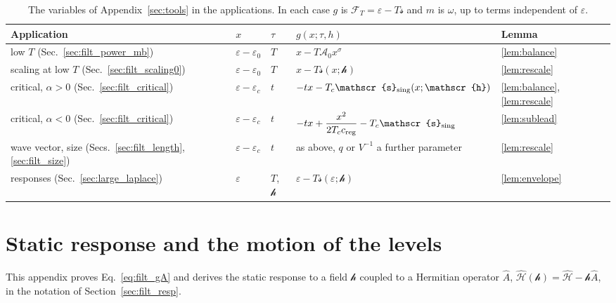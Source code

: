 \documentclass[10pt,a4paper]{article}
\theoremstyle{plain}
\newcommand{\cA}{{\mathcal{A}_0}}   %
\newcommand{\hfield}{\mathscr{h}}  %
\newcommand{\Fen}[1][T]{\mathscr{F}_{#1}}  %
\newcommand{\lds}{\mathscr{s}}  %
\begin{document}
\begin{table}[htbp]
\centering
\small
\caption{The variables of Appendix~\ref{sec:tools} in the applications. In
each case $g$ is $\Fen=\varepsilon-T\lds$ and $m$ is $\omega$, up to terms
independent of $\varepsilon$.}
\label{tab:tools}
\begin{tabular}{lllll}
\toprule
Application & $x$ & $\tau$ & $g(x;\tau,h)$ & Lemma \\
\midrule
low $T$ (Sec.~\ref{sec:filt_power_mb}) & $\varepsilon-\varepsilon_0$ & $T$ & $x-T\cA x^{\sigma}$ & \ref{lem:balance} \\[2pt]
scaling at low $T$ (Sec.~\ref{sec:filt_scaling0}) & $\varepsilon-\varepsilon_0$ & $T$ & $x-T\lds(x;\hfield)$ & \ref{lem:rescale} \\[2pt]
critical, $\alpha>0$ (Sec.~\ref{sec:filt_critical}) & $\varepsilon-\varepsilon_c$ & $t$ & $-tx-T_c\lds_{\rm sing}(x;\hfield)$ & \ref{lem:balance}, \ref{lem:rescale} \\[2pt]
critical, $\alpha<0$ (Sec.~\ref{sec:filt_critical}) & $\varepsilon-\varepsilon_c$ & $t$ & $-tx+\dfrac{x^{2}}{2T_cc_{\rm reg}}-T_c\lds_{\rm sing}$ & \ref{lem:sublead} \\[4pt]
wave vector, size (Secs.~\ref{sec:filt_length}, \ref{sec:filt_size}) & $\varepsilon-\varepsilon_c$ & $t$ & as above, $q$ or $V^{-1}$ a further parameter & \ref{lem:rescale} \\[2pt]
responses (Sec.~\ref{sec:large_laplace}) & $\varepsilon$ & $T$, $\hfield$ & $\varepsilon-T\lds(\varepsilon;\hfield)$ & \ref{lem:envelope} \\
\bottomrule
\end{tabular}
\end{table}

\section{Static response and the motion of the levels}
\label{app:lehmann}\label{app:continuity}

This appendix proves Eq.~\eqref{eq:filt_gA} and derives the static response
to a field $ \hfield $ coupled to a Hermitian operator $ \hat A $,
$ \hat{\mathcal{H}}(\hfield) = \hat{\mathcal{H}} - \hfield\hat A $, in the
notation of Section~\ref{sec:filt_resp}.
\end{document}
